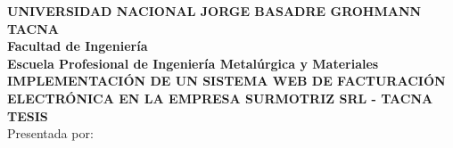\begin{titlepage}
    \begin{center}
        \LARGE{ \textbf{UNIVERSIDAD NACIONAL JORGE BASADRE GROHMANN TACNA}}\\
        \vspace{5mm}
        \Large{ \textbf{Facultad de Ingeniería}} \\
        \vspace{5mm}
        \huge{ \textbf{Escuela Profesional de Ingeniería Metalúrgica y Materiales}}\\
        \vspace{7mm}
        \LARGE{}{ \textbf{IMPLEMENTACIÓN DE UN SISTEMA WEB DE FACTURACIÓN ELECTRÓNICA EN LA EMPRESA SURMOTRIZ SRL - TACNA}}\\
        \vspace{8mm}
        \huge{ \textbf{TESIS}}\\
        \vspace{7mm}
        \large{Presentada por:}
    \end{center}
\end{titlepage}
